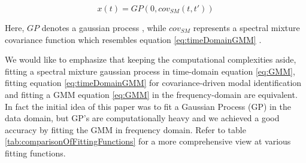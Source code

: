 \begin{equation}\label{eq:dataDomainGMM}
    x(t) = GP(0 , cov_{SM}(t, t'))
\end{equation}

Here, \(GP\) denotes a gaussian process \cite{Rasmussen2005}, while \(cov_{SM}\) represents a spectral mixture covariance function which resembles equation \ref{eq:timeDomainGMM} \cite{wilson2013gaussian}. 

We would like to emphasize that keeping the computational complexities aside, fitting a spectral mixture gaussian process in time-domain equation \ref{eq:GMM}, fitting equation \ref{eq:timeDomainGMM} for covariance-driven modal identification and fitting a GMM equation \ref{eq:GMM} in the frequency-domain are equivalent. In fact the initial idea of this paper was to fit a Gaussian Process (GP) in the data domain, but GP's are computationally heavy and we achieved a good accuracy by fitting the GMM in frequency domain. Refer to table \ref{tab:comparisonOfFittingFunctions} for a more comprehensive view at various fitting functions.

